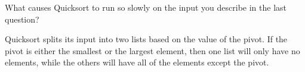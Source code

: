 What causes Quicksort to run so slowly on the input you describe in the last question?

\begin{answer}
Quicksort splits its input into two lists based on the value of the pivot.
If the pivot is either the smallest or the largest element, then one list
will only have no elements, while the others will have all of the elements except the pivot.
\end{answer}